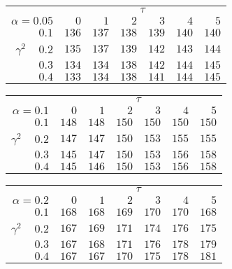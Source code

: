 \begin{tabular}{r|rrrrrr}
\hline\hline
 &\multicolumn{6}{c}{$\tau$} \\ 
 $\alpha = 0.05$ & $0$ & $1$ & $2$ & $3$ & $4$ & $5$ \\ 
 \hline$0.1$ & $136$ & $137$ & $138$ & $139$ & $140$ & $140$\\ 
$\gamma^2\;\;\;$ $0.2$ & $135$ & $137$ & $139$ & $142$ & $143$ & $144$\\ 
$0.3$ & $134$ & $134$ & $138$ & $142$ & $144$ & $145$\\ 
$0.4$ & $133$ & $134$ & $138$ & $141$ & $144$ & $145$\\ 
 \hline 
 \end{tabular}
 
 \vspace{2em} 
 
\begin{tabular}{r|rrrrrr}
\hline\hline
 &\multicolumn{6}{c}{$\tau$} \\ 
 $\alpha = 0.1$ & $0$ & $1$ & $2$ & $3$ & $4$ & $5$ \\ 
 \hline$0.1$ & $148$ & $148$ & $150$ & $150$ & $150$ & $150$\\ 
$\gamma^2\;\;\;$ $0.2$ & $147$ & $147$ & $150$ & $153$ & $155$ & $155$\\ 
$0.3$ & $145$ & $147$ & $150$ & $153$ & $156$ & $158$\\ 
$0.4$ & $145$ & $146$ & $150$ & $153$ & $156$ & $158$\\ 
 \hline 
 \end{tabular}
 
 \vspace{2em} 
 
\begin{tabular}{r|rrrrrr}
\hline\hline
 &\multicolumn{6}{c}{$\tau$} \\ 
 $\alpha = 0.2$ & $0$ & $1$ & $2$ & $3$ & $4$ & $5$ \\ 
 \hline$0.1$ & $168$ & $168$ & $169$ & $170$ & $170$ & $168$\\ 
$\gamma^2\;\;\;$ $0.2$ & $167$ & $169$ & $171$ & $174$ & $176$ & $175$\\ 
$0.3$ & $167$ & $168$ & $171$ & $176$ & $178$ & $179$\\ 
$0.4$ & $167$ & $167$ & $170$ & $175$ & $178$ & $181$\\ 
 \hline 
 \end{tabular}